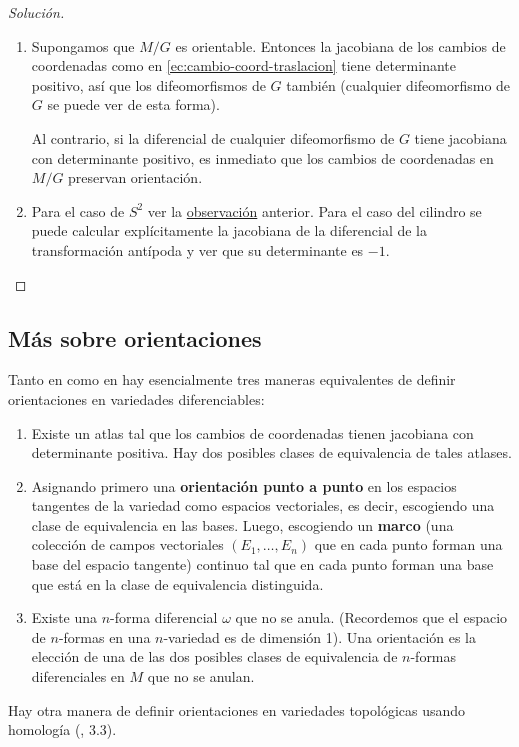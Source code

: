 \documentclass[spanish]{book}
\theoremstyle{definition}
\begin{document}
\begin{proof}[Solución]
\begin{enumerate}
			\item Supongamos que $M/G$ es orientable. Entonces la jacobiana de los cambios de coordenadas como en \ref{ec:cambio-coord-traslacion} tiene determinante positivo, así que los difeomorfismos de $G$ también (cualquier difeomorfismo de $G$ se puede ver de esta forma).
				
			Al contrario, si la diferencial de cualquier difeomorfismo de $G$ tiene jacobiana con determinante positivo, es inmediato que los cambios de coordenadas en $M/G$ preservan orientación.
			
			\item Para el caso de $S^2$ ver la \hyperref[obs:antipoda-orientacion]{observación} anterior. Para el caso del cilindro se puede calcular explícitamente la jacobiana de la diferencial de la transformación antípoda y ver que su determinante es $-1$.
		\end{enumerate}
	\end{proof}
	
	\subsection{Más sobre orientaciones}
	Tanto en \cite{Lee} como en \cite{Loring} hay esencialmente tres maneras equivalentes de definir orientaciones en variedades diferenciables:
	\begin{enumerate}
		\item Existe un atlas tal que los cambios de coordenadas tienen jacobiana con determinante positiva. Hay dos posibles clases de equivalencia de tales atlases.
		\item Asignando primero una \textbf{orientación punto a punto} en los espacios tangentes de la variedad como espacios vectoriales, es decir, escogiendo una clase de equivalencia en las bases. Luego, escogiendo un \textbf{marco} (una colección de campos vectoriales $(E_1,\ldots,E_n)$ que en cada punto forman una base del espacio tangente) continuo tal que en cada punto forman una base que está en la clase de equivalencia distinguida.
		\item Existe una $n$-forma diferencial $\omega$ que no se anula. (Recordemos que el espacio de $n$-formas en una $n$-variedad es de dimensión 1). Una orientación es la elección de una de las dos posibles  clases de equivalencia de $n$-formas diferenciales en $M$ que no se anulan.
	\end{enumerate}
	Hay otra manera de definir orientaciones en variedades topológicas usando homología (\cite{Hatcher}, 3.3).
	
\end{document}
